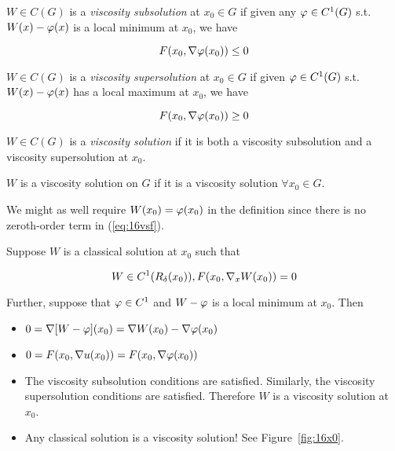 \begin{definition}
$W\in C(G)$ is a \textit{viscosity subsolution} at $x_0\in G$ if given any $\varphi\in C^1(G)$ s.t. $W(x)-\varphi(x)$ is a local minimum at $x_0$, we have

\begin{equation*}
F(x_0,\nabla\varphi(x_0))\leq0
\end{equation*}

\end{definition}

\begin{definition}
$W\in C(G)$ is a \textit{viscosity supersolution} at $x_0\in G$ if given $\varphi\in C^1(G)$ s.t. $W(x)-\varphi(x)$ has a local maximum at $x_0$, we have

\begin{equation*}
F(x_0,\nabla\varphi(x_0))\geq0
\end{equation*}

\end{definition}

\begin{definition}
$W\in C(G)$ is a \textit{viscosity solution} if it is both a viscosity subsolution and a viscosity supersolution at $x_0$.
\end{definition}

\begin{definition}
$W$ is a viscosity solution on $G$ if it is a viscosity solution $\forall x_0\in G$.
\end{definition}

\begin{remark}
We might as well require $W(x_0)=\varphi(x_0)$ in the definition since there is no zeroth-order term in (\ref{eq:16vsf}).
\end{remark}

\begin{remark}
Suppose $W$ is a classical solution at $x_0$ such that

\begin{equation*}
W\in C^1(R_\delta(x_0)), F(x_0,\nabla_xW(x_0))=0
\end{equation*}

Further, suppose that $\varphi\in C^1$ and $W-\varphi$ is a local minimum at $x_0$.
Then
\begin{itemize}
\item $0 = \nabla[W-\varphi](x_0) = \nabla W(x_0)-\nabla\varphi(x_0)$
\item $0 = F(x_0,\nabla u(x_0)) = F(x_0,\nabla\varphi(x_0))$
\item The viscosity subsolution conditions are satisfied.
      Similarly, the viscosity supersolution conditions are satisfied.
      Therefore $W$ is a viscosity solution at $x_0$.
\item Any classical solution is a viscosity solution! See Figure~\ref{fig:16x0}.
\end{itemize}
\end{remark}


